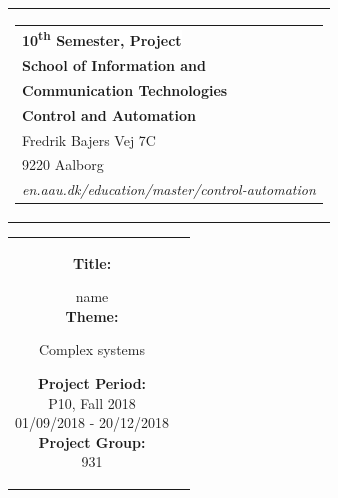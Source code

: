 % 
\begin{nopagebreak}
{\samepage 

\begin{tabular}{r}
\parbox{\textwidth}{  
\hfill \hspace{2cm} \parbox{8cm}{\begin{tabular}{l} %
{\small \textbf{\textcolor{aaublue}{\colorbox{white}{10\textsuperscript{th} Semester, Project}}}}\\
{\small \textbf{\textcolor{aaublue}{School of Information and}}}\\
{\small \textbf{\textcolor{aaublue}{Communication Technologies}}}\\ 
{\small \textbf{\textcolor{aaublue}{Control and Automation}}}\\
{\small \textcolor{aaublue}{Fredrik Bajers Vej 7C}} \\
{\small \textcolor{aaublue}{9220 Aalborg}} \\
{\small \textcolor{aaublue}{\emph{en.aau.dk/education/master/control-automation}}}
\end{tabular}}}
\end{tabular}

\begin{tabular}{cc}
\parbox{7cm}{

\textbf{Title:}

name \\ %

\textbf{Theme:}

\small{
 Complex systems\\
}


\parbox{8cm}{


\textbf{Project Period:}\\
P10, Fall 2018\\
01/09/2018 - 20/12/2018\\
   
\textbf{Project Group:}\\
931\\ %
  
}}
\end{tabular}}
\end{nopagebreak}
